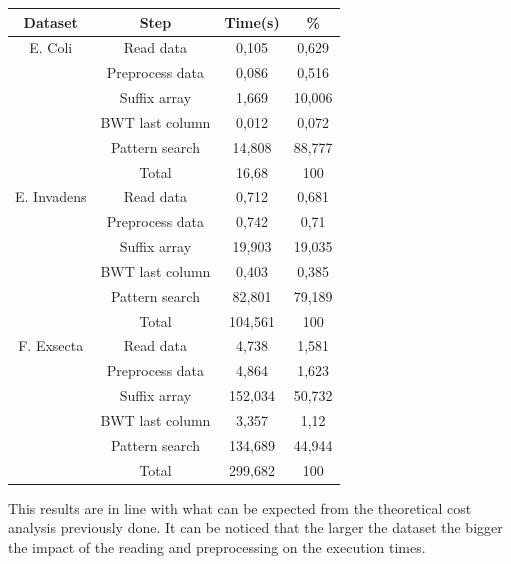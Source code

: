 \documentclass[final,5p,times,twocolumn,authoryear]{elsarticle}
\begin{document}
\begin{center}
\begin{tabular}{|| c c c c ||}
\hline
Dataset & Step & Time(s) & \% \\
\hline
 E. Coli & Read data & 0,105 & 0,629 \\
    & Preprocess data & 0,086 & 0,516 \\
    & Suffix array & 1,669 & 10,006 \\
    & BWT last column & 0,012 & 0,072 \\
    & Pattern search & 14,808 & 88,777 \\
    & Total & 16,68 & 100 \\
\hline
E. Invadens & Read data & 0,712 & 0,681 \\
    & Preprocess data & 0,742 & 0,71 \\
    & Suffix array & 19,903 & 19,035 \\
    & BWT last column & 0,403 & 0,385 \\
    & Pattern search & 82,801 & 79,189 \\
    & Total & 104,561 & 100 \\
\hline
F. Exsecta & Read data & 4,738 & 1,581 \\
    & Preprocess data & 4,864 & 1,623 \\
    & Suffix array & 152,034 & 50,732 \\
    & BWT last column & 3,357 & 1,12 \\
    & Pattern search & 134,689 & 44,944 \\
    & Total & 299,682 & 100 \\
\hline
\end{tabular}
\label{fig:times_table}
\end{center}
This results are in line with what can be expected from the theoretical cost analysis previously done. It can be noticed that the larger the dataset the bigger the impact of the reading and preprocessing on the execution times.
\end{document}
